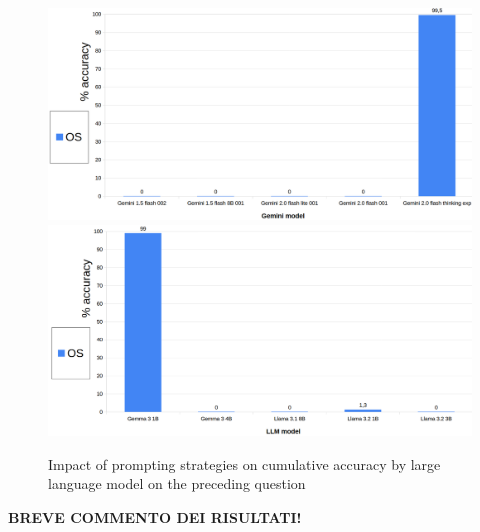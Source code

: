 \documentclass[12pt]{article}
\begin{document}
\begin{figure}[H]
    \centering
            \includegraphics[width=1\textwidth]{q202Gemini.png}
            \includegraphics[width=1\textwidth]{q202Other.png}
    \caption[Accuracy on Question 8 by LLM]{Impact of prompting strategies on cumulative accuracy by large language model on the preceding question}
    \end{figure} 
\textbf{BREVE COMMENTO DEI RISULTATI!}

\vspace{1cm}

\end{document}
